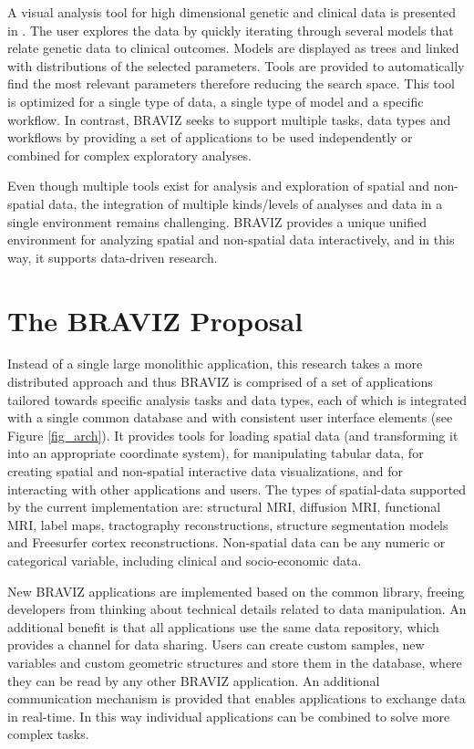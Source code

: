 \documentclass[twocolumn]{svjour3}
\begin{document}
A visual analysis tool for high dimensional genetic and clinical data is presented in \cite{hinterberg_peax:_2014}. The user explores the data by quickly iterating through several models that relate genetic data to clinical outcomes. Models are displayed as trees and linked with distributions of the selected parameters. Tools are provided to automatically find the most relevant parameters therefore reducing the search space. This tool is optimized for a single type of data, a single type of model and a specific workflow. In contrast, BRAVIZ seeks to support multiple tasks, data types and workflows by providing a set of  applications to be used independently or combined for complex exploratory analyses.
	
Even though multiple tools  exist for analysis and exploration of spatial and non-spatial data, the integration of multiple kinds/levels of analyses and data in a single environment remains challenging. BRAVIZ provides a unique unified environment for analyzing spatial and non-spatial data interactively, and in this way, it supports data-driven research.

\section{The BRAVIZ Proposal}

Instead of a single large monolithic application, this research takes a more distributed approach and thus BRAVIZ is comprised of a set of applications tailored towards specific analysis tasks and data types, each of which is integrated with a single common database and with consistent user interface elements (see Figure \ref{fig_arch}). It provides tools for loading spatial data (and transforming it into an appropriate coordinate system), for manipulating tabular data, for creating spatial and non-spatial interactive data visualizations, and for interacting with other applications and users. The types of spatial-data supported by the current implementation are: structural MRI, diffusion MRI, functional MRI, label maps, tractography reconstructions, structure segmentation models and Freesurfer cortex reconstructions. Non-spatial data can be any numeric or categorical variable, including clinical and socio-economic data.

New BRAVIZ applications are implemented based on the common library, freeing developers from thinking about technical details related to data manipulation. An additional benefit is that all applications use the same data repository, which provides a channel for data sharing. Users can create custom samples, new variables and custom geometric structures and store them in the database, where they can be read by any other BRAVIZ application. An additional communication mechanism is provided that enables applications to exchange data in real-time. In this way individual applications can be combined to solve more complex tasks.
\end{document}
